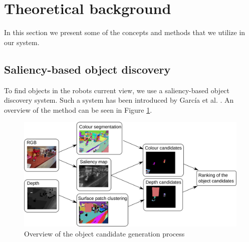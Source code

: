 \documentclass[a4paper,11pt,english]{article}
\begin{document}
\section{Theoretical background}
\label{Theoretical_background}

In this section we present some of the concepts and methods that we utilize in our system.

\subsection{Saliency-based object discovery}
\label{Theoretical_background:Saliency-based_object_discovery}
To find objects in the robots current view, we use a saliency-based object discovery system.
Such a system has been introduced by García et al. \cite{garcia2015saliency}.
An overview of the method can be seen in Figure \ref{fig:2Dobject_discovery}.

\begin{figure}[h!]
	\begin{center}
		\includegraphics[width=1\textwidth]{src/saliency_object_detection.png}
		\caption{ Overview of the object candidate generation process \cite{garcia2015saliency}}
		\label{fig:2Dobject_discovery}
	\end{center}
\end{figure}
\end{document}
